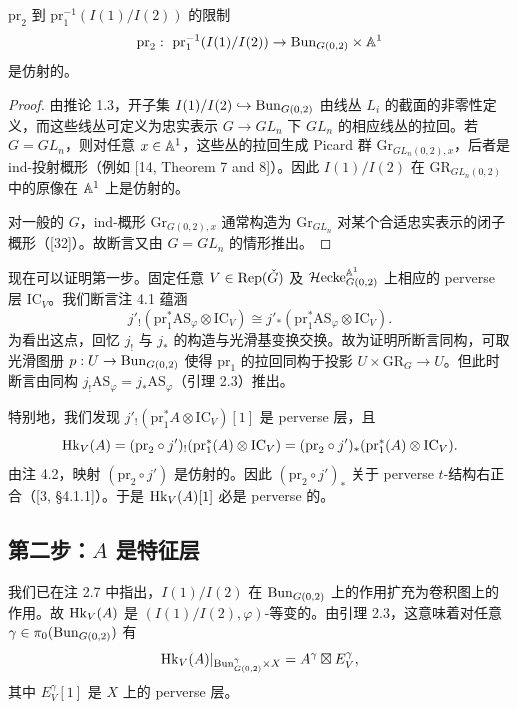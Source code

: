 \begin{remark}
$\mathrm{pr}_2$ 到 $\mathrm{pr}_1^{-1}(I(1)/I(2))$ 的限制
\[
\mathrm{pr}_2:\ \mathrm{pr}_1^{-1}(I(1)/I(2))\to\Bun_{G(0,2)}\times\Aff^1
\]
是仿射的。
\end{remark}

\begin{proof}
由推论 1.3，开子集 $I(1)/I(2)\hookrightarrow\mathrm{Bun}_{G(0,2)}$ 由线丛 $L_i$ 的截面的非零性定义，而这些线丛可定义为忠实表示 $G\to GL_n$ 下 $GL_n$ 的相应线丛的拉回。若 $G=GL_n$，则对任意 $x\in\mathbb{A}^1$，这些丛的拉回生成 Picard 群 $\mathrm{Gr}_{GL_n(0,2),x}$，后者是 ind-投射概形（例如 [14, Theorem 7 and 8]）。因此 $I(1)/I(2)$ 在 $\mathrm{GR}_{GL_n(0,2)}$ 中的原像在 $\mathbb{A}^1$ 上是仿射的。

对一般的 $G$，ind-概形 $\mathrm{Gr}_{G(0,2),x}$ 通常构造为 $\mathrm{Gr}_{GL_n}$ 对某个合适忠实表示的闭子概形（[32]）。故断言又由 $G=GL_n$ 的情形推出。
\end{proof}

现在可以证明第一步。固定任意 $V\in\mathrm{Rep}(\check G)$ 及 $\mathcal{H}\mathrm{ecke}^{\mathbb{A}^1}_{G(0,2)}$ 上相应的 perverse 层 $\mathrm{IC}_V$。我们断言注 4.1 蕴涵
\[
j'_!(\mathrm{pr}_1^*\mathrm{AS}_\varphi\otimes\mathrm{IC}_V)\cong j'_*(\mathrm{pr}_1^*\mathrm{AS}_\varphi\otimes\mathrm{IC}_V).
\]
为看出这点，回忆 $j_!$ 与 $j_*$ 的构造与光滑基变换交换。故为证明所断言同构，可取光滑图册 $p:U\to\mathrm{Bun}_{G(0,2)}$ 使得 $\mathrm{pr}_1$ 的拉回同构于投影 $U\times\mathrm{GR}_G\to U$。但此时断言由同构 $j_!\mathrm{AS}_\varphi=j_*\mathrm{AS}_\varphi$（引理 2.3）推出。

特别地，我们发现 $j'_!(\mathrm{pr}_1^*A\otimes\mathrm{IC}_V)[1]$ 是 perverse 层，且
\[
\mathrm{Hk}_V(A)=(\mathrm{pr}_2\circ j')_!(\mathrm{pr}_1^*(A)\otimes\mathrm{IC}_V)
=(\mathrm{pr}_2\circ j')_*(\mathrm{pr}_1^*(A)\otimes\mathrm{IC}_V).
\]
由注 4.2，映射 $(\mathrm{pr}_2\circ j')$ 是仿射的。因此 $(\mathrm{pr}_2\circ j')_*$ 关于 perverse $t$-结构右正合（[3, §4.1.1]）。于是 $\mathrm{Hk}_V(A)[1]$ 必是 perverse 的。

\subsection{第二步：$A$ 是特征层}

我们已在注 2.7 中指出，$I(1)/I(2)$ 在 $\mathrm{Bun}_{G(0,2)}$ 上的作用扩充为卷积图上的作用。故 $\mathrm{Hk}_V(A)$ 是 $(I(1)/I(2),\varphi)$-等变的。由引理 2.3，这意味着对任意 $\gamma\in\pi_0(\mathrm{Bun}_{G(0,2)})$ 有
\[
\mathrm{Hk}_V(A)|_{\mathrm{Bun}^\gamma_{G(0,2)}\times X}=A^\gamma\boxtimes E^\gamma_V,
\]
其中 $E^\gamma_V[1]$ 是 $X$ 上的 perverse 层。

